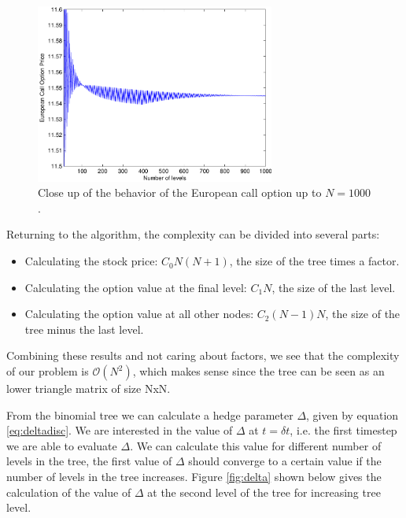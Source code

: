 \documentclass[11pt,a4paper]{article}
\begin{document}
\begin{figure}[H]
  \centering
  \includegraphics[width=0.7\textwidth]{closeup.pdf}
  \caption{Close up of the behavior of the European call option up to $N = 1000$.}
  \label{fig:closeup}
\end{figure}

Returning to the algorithm, the complexity can be divided into several parts:

\begin{itemize}
\item 
  Calculating the stock price: $C_{0} N(N+1)$, the size of the tree times a factor.
\item
  Calculating the option value at the final level: $C_{1} N$, the size of the last level.
\item
  Calculating the option value at all other nodes: $C_{2} (N-1)N$, the size of the tree minus the last level.
\end{itemize}

Combining these results and not caring about factors, we see that the complexity of our problem is $\mathcal{O}(N^2)$, which makes sense since the tree can be seen as an lower triangle matrix of size NxN.

From the binomial tree we can calculate a hedge parameter $\Delta$, given by equation \ref{eq:deltadisc}. We are interested in the value of $\Delta$ at $t = \delta t$, i.e. the first timestep we are able to evaluate $\Delta$. We can calculate this value for different number of levels in the tree, the first value of $\Delta$ should converge to a certain value if the number of levels in the tree increases. Figure \ref{fig:delta} shown below gives the calculation of the value of $\Delta$ at the second level of the tree for increasing tree level.
\end{document}

